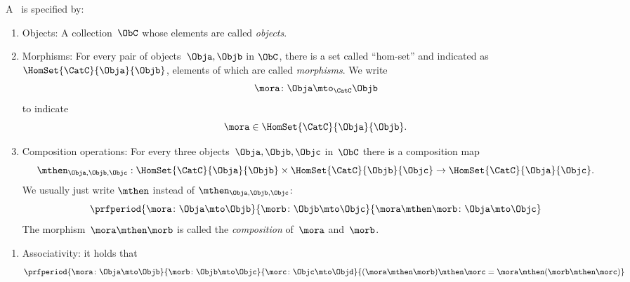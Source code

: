 \begin{ctdefinition}[Semicategory]
	\label{def:semicategory-compact}
	A \emph{}~\CatC is specified by:
	\begin{body}
		\constit
		\begin{enumerate}
			\item Objects: A collection\footnotemark~$\ObC$ whose elements are called \emph{objects}.
			\item Morphisms: For every pair of objects~$\Obja,\Objb$ in $\ObC$, there is a set called ``hom-set'' and indicated  as~$\HomSet{\CatC}{\Obja}{\Objb}$, elements of which are called \emph{morphisms}.
			We write
			\begin{equation}
				\mora \colon \Obja \mto_\CatC \Objb
			\end{equation}
			to indicate
			\begin{equation}
				\mora \in \HomSet{\CatC}{\Obja}{\Objb}.
			\end{equation}
			\item Composition operations: For every three objects~$\Obja,\Objb,\Objc$ in~$\ObC$ there is a composition map
			\begin{equation}
				\mthen_{\Obja,\Objb,\Objc}: \HomSet{\CatC}{\Obja}{\Objb} \times \HomSet{\CatC}{\Objb}{\Objc}\to \HomSet{\CatC}{\Obja}{\Objc}.
			\end{equation}
			We usually just write $\mthen$ instead of $\mthen_{\Obja,\Objb,\Objc}$:
			\begin{equation}
				\prfperiod{
					\mora \colon \Obja \mto \Objb
				}{
					\morb\colon \Objb \mto \Objc
				}{
					\mora \mthen \morb \colon \Obja \mto \Objc
				}
			\end{equation}
			The morphism~$\mora \mthen \morb$ is called the \emph{composition} of~$\mora$ and~$\morb$.
		\end{enumerate}
		\condit
		\begin{enumerate}
			\item Associativity: it holds that
			\begin{equation}
				\prfperiod{
					\mora\colon \Obja \mto \Objb
				}{
					\morb\colon \Objb \mto \Objc
				}{
					\morc\colon \Objc \mto \Objd
				}{
					(\mora\mthen \morb)
					\mthen \morc= \mora \mthen (\morb \mthen \morc)
				}
			\end{equation}
		\end{enumerate}
	\end{body}
\end{ctdefinition}

